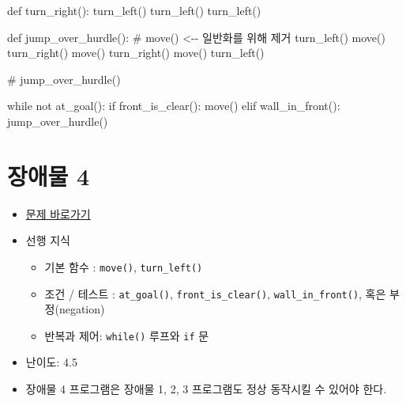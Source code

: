 \documentclass[
  b5paperpaper,
  DIV=11,
  numbers=noendperiod]{scrreprt}
\newenvironment{Shaded}{\begin{snugshade}}{\end{snugshade}}
\newcommand{\CommentTok}[1]{\textcolor[rgb]{0.37,0.37,0.37}{#1}}
\newcommand{\ControlFlowTok}[1]{\textcolor[rgb]{0.00,0.23,0.31}{#1}}
\newcommand{\FunctionTok}[1]{\textcolor[rgb]{0.28,0.35,0.67}{#1}}
\newcommand{\NormalTok}[1]{\textcolor[rgb]{0.00,0.23,0.31}{#1}}
\newcommand{\SpecialCharTok}[1]{\textcolor[rgb]{0.37,0.37,0.37}{#1}}
\providecommand{\tightlist}{%
  \setlength{\itemsep}{0pt}\setlength{\parskip}{0pt}}\usepackage{longtable,booktabs,array}
\begin{document}
\begin{Shaded}
\begin{Highlighting}[]
\NormalTok{def }\FunctionTok{turn\_right}\NormalTok{()}\SpecialCharTok{:}
    \FunctionTok{turn\_left}\NormalTok{()}
    \FunctionTok{turn\_left}\NormalTok{()}
    \FunctionTok{turn\_left}\NormalTok{()}

\NormalTok{def }\FunctionTok{jump\_over\_hurdle}\NormalTok{()}\SpecialCharTok{:}
    \CommentTok{\# move() \textless{}{-}{-} 일반화를 위해 제거}
    \FunctionTok{turn\_left}\NormalTok{()}
    \FunctionTok{move}\NormalTok{()}
    \FunctionTok{turn\_right}\NormalTok{()}
    \FunctionTok{move}\NormalTok{()}
    \FunctionTok{turn\_right}\NormalTok{()}
    \FunctionTok{move}\NormalTok{()}
    \FunctionTok{turn\_left}\NormalTok{()}

\CommentTok{\# jump\_over\_hurdle()    }

\ControlFlowTok{while}\NormalTok{ not }\FunctionTok{at\_goal}\NormalTok{()}\SpecialCharTok{:}
    \ControlFlowTok{if} \FunctionTok{front\_is\_clear}\NormalTok{()}\SpecialCharTok{:}
        \FunctionTok{move}\NormalTok{()}
\NormalTok{    elif }\FunctionTok{wall\_in\_front}\NormalTok{()}\SpecialCharTok{:}
        \FunctionTok{jump\_over\_hurdle}\NormalTok{()}
\end{Highlighting}
\end{Shaded}

\hypertarget{hurdle-04}{%
\section{장애물 4}\label{hurdle-04}}

\begin{itemize}
\tightlist
\item
  \href{https://reeborg.ca/reeborg.html?lang=ko-en\&mode=python\&menu=worlds\%2Fmenus\%2Freeborg_intro_en.json\&name=Hurdle\%204\&url=worlds\%2Ftutorial_en\%2Fhurdle4.json}{문제
  바로가기}
\item
  선행 지식

  \begin{itemize}
  \tightlist
  \item
    기본 함수 : \texttt{move()}, \texttt{turn\_left()}
  \item
    조건 / 테스트 : \texttt{at\_goal()}, \texttt{front\_is\_clear()},
    \texttt{wall\_in\_front()}, 혹은 부정(negation)
  \item
    반복과 제어: \texttt{while()} 루프와 \texttt{if} 문
  \end{itemize}
\item
  난이도: 4.5
\item
  장애물 4 프로그램은 장애물 1, 2, 3 프로그램도 정상 동작시킬 수 있어야
  한다.
\end{itemize}
\end{document}
